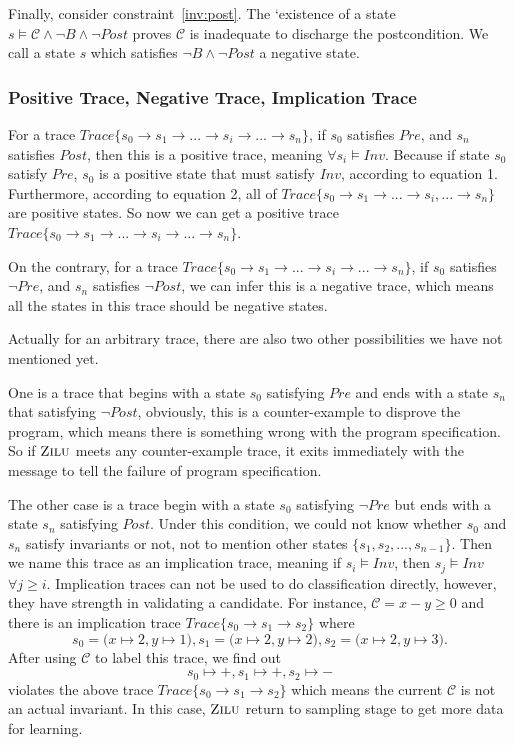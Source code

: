 Finally, consider constraint~\ref{inv:post}.
The `existence of a state $s \models \mathcal{C} \wedge \neg B \wedge \neg Post$ proves $\mathcal{C}$ is inadequate to discharge the postcondition. 
We call a state $s$ which satisfies $\neg{B} \wedge \neg{Post}$ a negative state. 



\subsubsection{Positive Trace, Negative Trace, Implication Trace}
\label{subsec:trace}
For a trace $Trace\{s_0 \to s_1 \to ... \to s_i \to ... \to s_n\}$, 
if $s_0$ satisfies $Pre$, and $s_n$ satisfies $Post$,
then this is a positive trace, meaning $\forall s_i \models Inv$.
Because if state $s_0$ satisfy $Pre$,
$s_0$ is a positive state that must satisfy $Inv$, according to equation 1.
Furthermore, according to equation 2,
all of $Trace\{s_0 \to s_1 \to ...\to s_i, ... \to s_n\}$ are positive states.
So now we can get a positive trace  $Trace\{s_0 \to s_1 \to ...\to s_i \to ... \to s_n\}$.

On the contrary, for a trace $Trace\{s_0 \to s_1 \to ...\to s_i \to ... \to s_n\}$, 
if $s_0$ satisfies $\neg Pre$, and $s_n$ satisfies $\neg Post$,
we can infer this is a negative trace, 
which means all the states in this trace should be negative states.  

Actually for an arbitrary trace, there are also two other possibilities we have not mentioned yet.

One is a trace that begins with a state $s_0$ satisfying $Pre$ and ends with a state $s_n$ that satisfying $\neg Post$,
obviously, this is a counter-example to disprove the program,
which means there is something wrong with the program specification.
So if $\textsc{Zilu}$ meets any counter-example trace, 
it exits immediately with the message to tell the failure of program specification. 

The other case is a trace begin with a state $s_0$ satisfying $\neg Pre$ but ends with a state $s_n$ satisfying $Post$.
Under this condition, we could not know whether $s_0$ and $s_n$ satisfy invariants or not,
not to mention other states $\{s_1, s_2, ..., s_{n-1}\}$.
Then we name this trace as an implication trace, meaning if $s_i \models Inv$, then $s_j \models Inv$ $\forall j \ge i$.
Implication traces can not be used to do classification directly, 
however, they have strength in validating a candidate.
For instance, $\mathcal{C} = x - y \ge 0$ and there is an implication trace 
$Trace\{s_0 \to s_1 \to s_2\}$ where 
$$s_0 = \big(x \mapsto 2, y \mapsto 1\big),  s_1 = \big(x \mapsto 2, y \mapsto 2\big),  s_2 = \big(x \mapsto 2, y \mapsto 3\big).$$
After using $\mathcal{C}$ to label this trace, we find out $$s_0 \mapsto +,  s_1 \mapsto +,  s_2 \mapsto -$$ 
violates the above trace $Trace\{s_0 \to s_1 \to s_2\}$ which means the current $\mathcal{C}$ is not an actual invariant.
In this case, $\textsc{Zilu}$ return to sampling stage to get more data for learning.


